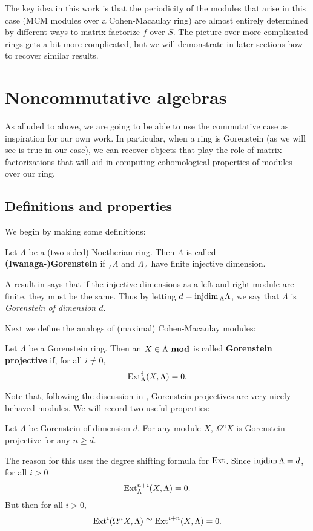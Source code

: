 \documentclass [11pt, proquest] {uwthesis}[2020/02/24]
\begin{document}
    The key idea in this work is that the periodicity of the modules that arise in this case (MCM modules over a Cohen-Macaulay ring) are almost entirely determined by different ways to matrix factorize $f$ over $S$. The picture over more complicated rings gets a bit more complicated, but we will demonstrate in later sections how to recover similar results.

\section{Noncommutative algebras}
    As alluded to above, we are going to be able to use the commutative case as inspiration for our own work. In particular, when a ring is Gorenstein (as we will see is true in our case), we can recover objects that play the role of matrix factorizations that will aid in computing cohomological properties of modules over our ring.
    
\subsection{Definitions and properties}
    We begin by making some definitions:
    \begin{defn}
        Let $\Lambda$ be a (two-sided) Noetherian ring.  Then $\Lambda$ is called \textbf{(Iwanaga-)Gorenstein} if $_\Lambda\Lambda$ and $\Lambda_\Lambda$ have finite injective dimension.
    \end{defn}
    \begin{rmk}
        A result in \cite[Lem. A]{zaks1969} says that if the injective dimensions as a left and right module are finite, they must be the same. Thus by letting $d=\operatorname{injdim} {_\Lambda\Lambda}$,
        we say that $\Lambda$ is \emph{Gorenstein of dimension $d$}.
    \end{rmk}
    
    Next we define the analogs of (maximal) Cohen-Macaulay modules:
    \begin{defn}
        Let $\Lambda$ be a Gorenstein ring. Then an $X\in\Lambda\text{-}\mathbf{mod}$ is called \textbf{Gorenstein projective} if, for all $i\ne 0$,
        \[\operatorname{Ext}^i_\Lambda(X,\Lambda)=0.\]
    \end{defn}
    
    Note that, following the discussion in \cite{krause-book}, Gorenstein projectives are very nicely-behaved modules. We will record two useful properties:
    \begin{prop}
        Let $\Lambda$ be Gorenstein of dimension $d$. For any module $X$, $\Omega^nX$ is Gorenstein projective for any $n\ge d.$
    \end{prop}
    The reason for this uses the degree shifting formula for $\operatorname{Ext}$. Since $\operatorname{injdim} \Lambda=d$, for all $i> 0$
    \[\operatorname{Ext}_\Lambda^{n+i}(X,\Lambda)=0.\]
    But then for all $i>0,$
    \[\operatorname{Ext}^i(\Omega^nX,\Lambda)\cong \operatorname{Ext}^{i+n}(X,\Lambda)=0.\]
    
\end{document}
